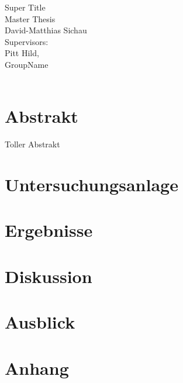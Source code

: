 \documentclass[12pt,oneside,  DIV13]{scrbook}
\begin{document}
\frontmatter

\begin{titlepage}
	\vspace*{2cm}
	\begin{center}
		{\LARGE Super Title \vspace*{2cm}\\ Master Thesis\\}
		\vspace*{2cm}\large David-Matthias Sichau \\
		\vspace*{1.5cm} Supervisors:\\ Pitt Hild, \\
		\vspace*{1cm} GroupName\\
		\vspace*{2cm}{\large 24. September 2014, Zürich}\\
	\end{center}
\end{titlepage}



\frontmatter 
\tableofcontents



\chapter*{Abstrakt}





Toller Abstrakt

\mainmatter









\chapter{Untersuchungsanlage}

\chapter{Ergebnisse}

\chapter{Diskussion}

\chapter{Ausblick}

\nocite{Gut2013a}
\nocite{Metzger2013}
\appendix 



\backmatter	

\printbibliography[heading=bibintoc]

\chapter{Anhang}
\end{document}
